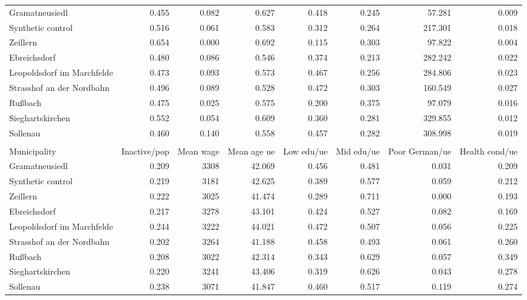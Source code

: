 \begin{tabular}{lrrrrrrr}
\midrule
Gramatneusiedl & 0.455 & 0.082 & 0.627 & 0.418 & 0.245 & 57.281 & 0.009\\
Synthetic control & 0.516 & 0.061 & 0.583 & 0.312 & 0.264 & 217.301 & 0.018\\
\addlinespace
Zeillern & 0.654 & 0.000 & 0.692 & 0.115 & 0.303 & 97.822 & 0.004\\
Ebreichsdorf & 0.480 & 0.086 & 0.546 & 0.374 & 0.213 & 282.242 & 0.022\\
Leopoldsdorf im Marchfelde & 0.473 & 0.093 & 0.573 & 0.467 & 0.256 & 284.806 & 0.023\\
Strasshof an der Nordbahn & 0.496 & 0.089 & 0.528 & 0.472 & 0.303 & 160.549 & 0.027\\
Rußbach & 0.475 & 0.025 & 0.575 & 0.200 & 0.375 & 97.079 & 0.016\\
Sieghartskirchen & 0.552 & 0.054 & 0.609 & 0.360 & 0.281 & 329.855 & 0.012\\
Sollenau & 0.460 & 0.140 & 0.558 & 0.457 & 0.282 & 308.998 & 0.019\\
\bottomrule
\addlinespace\multicolumn{8}{c}{\textbf{2020}}\\\addlinespace\toprule
Municipality & Inactive/pop & Mean wage & Mean age ue & Low edu/ue & Mid edu/ue & Poor German/ue & Health cond/ue\\
\midrule
Gramatneusiedl & 0.209 & 3308 & 42.069 & 0.456 & 0.481 & 0.031 & 0.209\\
Synthetic control & 0.219 & 3181 & 42.625 & 0.389 & 0.577 & 0.059 & 0.212\\
\addlinespace
Zeillern & 0.222 & 3025 & 41.474 & 0.289 & 0.711 & 0.000 & 0.193\\
Ebreichsdorf & 0.217 & 3278 & 43.101 & 0.424 & 0.527 & 0.082 & 0.169\\
Leopoldsdorf im Marchfelde & 0.244 & 3222 & 44.021 & 0.472 & 0.507 & 0.056 & 0.225\\
Strasshof an der Nordbahn & 0.202 & 3264 & 41.188 & 0.458 & 0.493 & 0.061 & 0.260\\
Rußbach & 0.208 & 3022 & 42.314 & 0.343 & 0.629 & 0.057 & 0.349\\
Sieghartskirchen & 0.220 & 3241 & 43.406 & 0.319 & 0.626 & 0.043 & 0.278\\
Sollenau & 0.238 & 3071 & 41.847 & 0.460 & 0.517 & 0.119 & 0.274\\
\bottomrule
\end{tabular}
